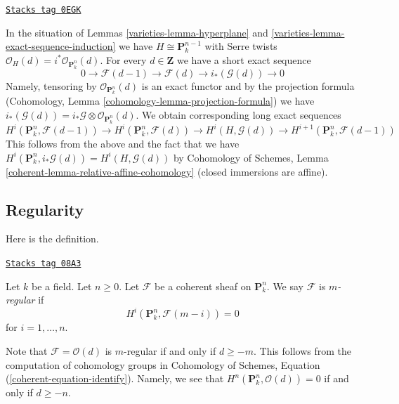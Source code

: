 \begin{remark}
\label{varieties-remark-exact-sequence-induction-cohomology}
\href{https://stacks.math.columbia.edu/tag/0EGK}{\texttt{Stacks tag 0EGK}}

In the situation of Lemmas \ref{varieties-lemma-hyperplane} and
\ref{varieties-lemma-exact-sequence-induction}
we have $H \cong \mathbf{P}^{n - 1}_k$ with Serre twists
$\mathcal{O}_H(d) = i^*\mathcal{O}_{\mathbf{P}^n_k}(d)$.
For every $d \in \mathbf{Z}$ we have a short exact sequence
$$
0 \to \mathcal{F}(d - 1) \to \mathcal{F}(d) \to i_*(\mathcal{G}(d)) \to 0
$$
Namely, tensoring by $\mathcal{O}_{\mathbf{P}^n_k}(d)$ is an
exact functor and by the projection formula
(Cohomology, Lemma \ref{cohomology-lemma-projection-formula})
we have
$i_*(\mathcal{G}(d)) = i_*\mathcal{G} \otimes \mathcal{O}_{\mathbf{P}^n_k}(d)$.
We obtain corresponding long exact sequences
$$
H^i(\mathbf{P}^n_k, \mathcal{F}(d - 1)) \to
H^i(\mathbf{P}^n_k, \mathcal{F}(d)) \to
H^i(H, \mathcal{G}(d)) \to
H^{i + 1}(\mathbf{P}^n_k, \mathcal{F}(d - 1))
$$
This follows from the above and the fact that we have
$H^i(\mathbf{P}^n_k, i_*\mathcal{G}(d)) = H^i(H, \mathcal{G}(d))$ by
Cohomology of Schemes, Lemma \ref{coherent-lemma-relative-affine-cohomology}
(closed immersions are affine).
\end{remark}


\subsection{Regularity}
\label{varieties-subsection-regularity}

Here is the definition.

\begin{definition}[Regularity]
\label{varieties-definition-regularity}
\href{https://stacks.math.columbia.edu/tag/08A3}{\texttt{Stacks tag 08A3}}

Let $k$ be a field. Let $n \geq 0$. Let $\mathcal{F}$ be a coherent
sheaf on $\mathbf{P}^n_k$. We say $\mathcal{F}$ is {\it $m$-regular}
if
$$
H^i(\mathbf{P}^n_k, \mathcal{F}(m - i)) = 0
$$
for $i = 1, \ldots, n$.
\end{definition}

Note that $\mathcal{F} = \mathcal{O}(d)$ is $m$-regular if and only
if $d \geq -m$. This follows from the computation of cohomology groups
in Cohomology of Schemes, Equation (\ref{coherent-equation-identify}).
Namely, we see that $H^n(\mathbf{P}^n_k, \mathcal{O}(d)) = 0$
if and only if $d \geq -n$.

